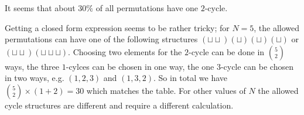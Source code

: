 \vspace{2mm}

It seems that about $30\%$ of all permutations have one $2$-cycle.

Getting a closed form expression seems to be rather tricky; for $N=5$, the allowed permutations can have one of the following structures $(\sqcup \sqcup)(\sqcup)(\sqcup)(\sqcup)$ or $(\sqcup\sqcup)(\sqcup\sqcup\sqcup)$. Choosing two elements for the $2$-cycle can be done in ${5 \choose 2}$ ways, the three $1$-cylces can be chosen in one way, the one $3$-cycle can be chosen in two ways, e.g. $(1,2,3)$ and $(1,3,2)$. So in total we have ${5 \choose 2} \times (1 + 2) = 30$ which matches the table. For other values of $N$ the allowed cycle structures are different and require a different calculation.

